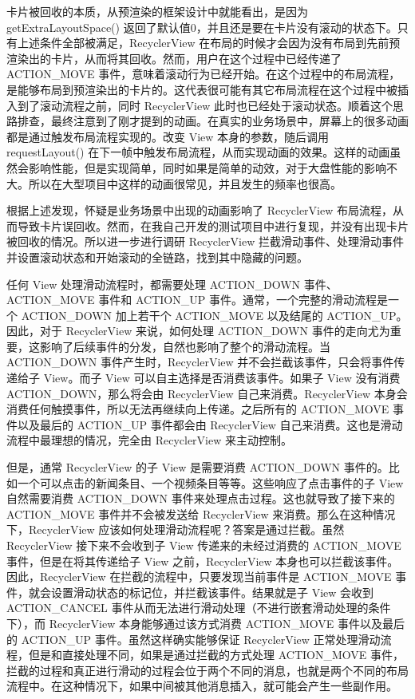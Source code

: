 卡片被回收的本质，从预渲染的框架设计中就能看出，是因为 getExtraLayoutSpace() 返回了默认值0，并且还是要在卡片没有滚动的状态下。只有上述条件全部被满足，RecyclerView 在布局的时候才会因为没有布局到先前预渲染出的卡片，从而将其回收。然而，用户在这个过程中已经传递了 ACTION\_MOVE 事件，意味着滚动行为已经开始。在这个过程中的布局流程，是能够布局到预渲染出的卡片的。这代表很可能有其它布局流程在这个过程中被插入到了滚动流程之前，同时 RecyclerView 此时也已经处于滚动状态。顺着这个思路排查，最终注意到了刚才提到的动画。在真实的业务场景中，屏幕上的很多动画都是通过触发布局流程实现的。改变 View 本身的参数，随后调用 requestLayout() 在下一帧中触发布局流程，从而实现动画的效果。这样的动画虽然会影响性能，但是实现简单，同时如果是简单的动效，对于大盘性能的影响不大。所以在大型项目中这样的动画很常见，并且发生的频率也很高。

根据上述发现，怀疑是业务场景中出现的动画影响了 RecyclerView 布局流程，从而导致卡片误回收。然而，在我自己开发的测试项目中进行复现，并没有出现卡片被回收的情况。所以进一步进行调研 RecyclerView 拦截滑动事件、处理滑动事件并设置滚动状态和开始滚动的全链路，找到其中隐藏的问题。

任何 View 处理滑动流程时，都需要处理 ACTION\_DOWN 事件、ACTION\_MOVE 事件和 ACTION\_UP 事件。通常，一个完整的滑动流程是一个 ACTION\_DOWN 加上若干个 ACTION\_MOVE 以及结尾的 ACTION\_UP。因此，对于 RecyclerView 来说，如何处理 ACTION\_DOWN 事件的走向尤为重要，这影响了后续事件的分发，自然也影响了整个的滑动流程。当 ACTION\_DOWN 事件产生时，RecyclerView 并不会拦截该事件，只会将事件传递给子 View。而子 View 可以自主选择是否消费该事件。如果子 View 没有消费 ACTION\_DOWN，那么将会由 RecyclerView 自己来消费。RecyclerView 本身会消费任何触摸事件，所以无法再继续向上传递。之后所有的 ACTION\_MOVE 事件以及最后的 ACTION\_UP 事件都会由 RecyclerView 自己来消费。这也是滑动流程中最理想的情况，完全由 RecyclerView 来主动控制。

但是，通常 RecyclerView 的子 View 是需要消费 ACTION\_DOWN 事件的。比如一个可以点击的新闻条目、一个视频条目等等。这些响应了点击事件的子 View 自然需要消费 ACTION\_DOWN 事件来处理点击过程。这也就导致了接下来的 ACTION\_MOVE 事件并不会被发送给 RecyclerView 来消费。那么在这种情况下，RecyclerView 应该如何处理滑动流程呢？答案是通过拦截。虽然 RecyclerView 接下来不会收到子 View 传递来的未经过消费的 ACTION\_MOVE 事件，但是在将其传递给子 View 之前，RecyclerView 本身也可以拦截该事件。因此，RecyclerView 在拦截的流程中，只要发现当前事件是 ACTION\_MOVE 事件，就会设置滑动状态的标记位，并拦截该事件。结果就是子 View 会收到 ACTION\_CANCEL 事件从而无法进行滑动处理（不进行嵌套滑动处理的条件下），而 RecyclerView 本身能够通过该方式消费 ACTION\_MOVE 事件以及最后的 ACTION\_UP 事件。虽然这样确实能够保证 RecyclerView 正常处理滑动流程，但是和直接处理不同，如果是通过拦截的方式处理 ACTION\_MOVE 事件，拦截的过程和真正进行滑动的过程会位于两个不同的消息，也就是两个不同的布局流程中。在这种情况下，如果中间被其他消息插入，就可能会产生一些副作用。

